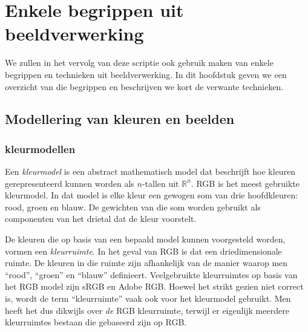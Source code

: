 \chapter{Enkele begrippen uit beeldverwerking}

We zullen in het vervolg van deze scriptie ook gebruik maken van enkele
begrippen en technieken uit beeldverwerking. In dit hoofdstuk geven we 
een overzicht van die begrippen en beschrijven we kort de verwante
technieken.

\section{Modellering van kleuren en beelden}

\subsection{kleurmodellen}

Een \emph{kleurmodel} is een abstract mathematisch model dat beschrijft hoe kleuren gerepresenteerd 
kunnen worden als $n$-tallen uit $\mathbb{R}^n$. RGB is het meest gebruikte kleurmodel. In dat model is elke kleur
een gewogen som van drie hoofdkleuren: rood, groen en blauw. De gewichten van die som
worden gebruikt als componenten van het drietal dat de kleur voorstelt. 

De kleuren die op basis van een bepaald model kunnen voorgesteld worden, vormen een \emph{kleurruimte}. 
In het geval van RGB is dat een driedimensionale ruimte. De kleuren in die ruimte zijn afhankelijk
van de manier waarop men ``rood'', ``groen'' en ``blauw'' definieert. Veelgebruikte kleurruimtes 
op basis van het RGB model zijn sRGB en Adobe RGB.
Hoewel het strikt gezien niet correct is, wordt de term ``kleurruimte'' vaak ook voor het
kleurmodel gebruikt. Men heeft het dus dikwijls over \emph{de} RGB kleurruimte, terwijl er eigenlijk meerdere
kleurruimtes bestaan die gebaseerd zijn op RGB. 

